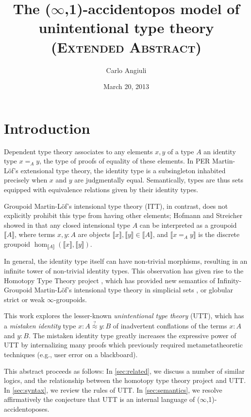 \documentclass[10pt]{article}
\title{The ($\infty$,1)-accidentopos model of\\ unintentional type theory \\
\textsc{\large{(Extended Abstract)}}}
\author{Carlo Angiuli}
\date{March 20, 2013}
\newcommand\Id[3]{\ensuremath{#2 =_{#1} #3}}
\newcommand\interp[1]{\ensuremath{\llbracket #1\rrbracket}}
\newcommand\AccRel{\ensuremath{\overset{?}{\approx}}}
\newcommand\Acc[4]{\ensuremath{#3{:}#1 \AccRel #4{:}#2}}
\begin{document}
\maketitle


\section{Introduction}

Dependent type theory associates to any elements $x,y$ of a type $A$ an identity
type $\Id Axy$, the type of proofs of equality of these elements. In PER
Martin-L\"of's extensional type theory, the identity type is a subsingleton
inhabited precisely when $x$ and $y$ are judgmentally equal. Semantically,
types are thus sets equipped with equivalence relations given by their identity
types.

Groupoid Martin-L\"of's intensional type theory (ITT), in contrast, does not
explicitly prohibit this type from having other elements; Hofmann and Streicher
showed in \cite{HofmannStreicher} that any closed intensional type $A$ can be
interpreted as a groupoid $\interp{A}$, where terms $x,y:A$ are objects
$\interp{x},\interp{y}\in\interp{A}$, and $\interp{\Id Axy}$ is the discrete
groupoid $\hom_{\interp A}(\interp x,\interp y)$.

In general, the identity type itself can have non-trivial morphisms, resulting
in an infinite tower of non-trivial identity types. This observation has given
rise to the Homotopy Type Theory project \cite{HoTT}, which has provided new
semantics of Infinity-Groupoid Martin-L\"of's intensional type theory in
simplicial sets \cite{KapulkinLumsdaineVoevodsky}, or globular strict
\cite{Warren} or weak $\infty$-groupoids. 

This work explores the lesser-known \emph{unintentional type theory} (UTT),
which has a \emph{mistaken identity} type $\Acc ABxy$ of inadvertent conflations
of the terms $x:A$ and $y:B$. The mistaken identity type greatly increases the
expressive power of UTT by internalizing many proofs which previously required
metametatheoretic techniques (e.g., user error on a blackboard).

This abstract proceeds as follows: In \autoref{sec:related}, we discuss a number
of similar logics, and the relationship between the homotopy type theory project
and UTT. In \autoref{sec:syntax}, we review the rules of UTT. In
\autoref{sec:semantics}, we resolve affirmatively the conjecture that UTT is an
internal language of ($\infty$,1)-accidentoposes.
\end{document}
